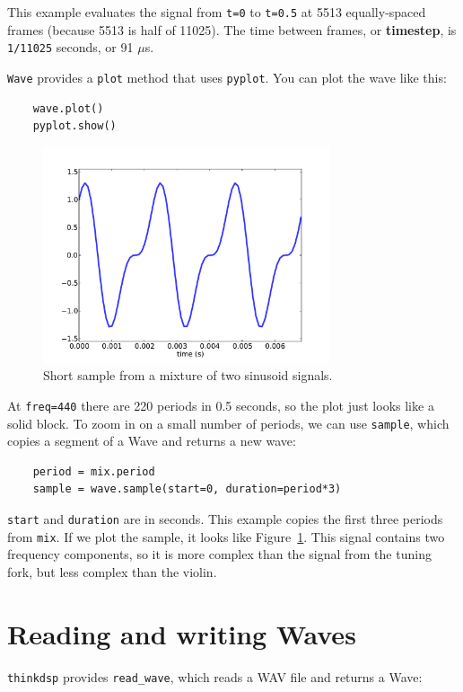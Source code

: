 \documentclass[12pt]{book}
\begin{document}
This example evaluates the signal from {\tt t=0} to {\tt t=0.5} at
5513 equally-spaced frames (because 5513 is half of 11025).
The time between frames, or {\bf timestep}, is {\tt 1/11025} seconds, or
91 $\mu$s.

{\tt Wave} provides a {\tt plot} method that uses {\tt pyplot}.
You can plot the wave like this:

\begin{verbatim}
    wave.plot()
    pyplot.show()
\end{verbatim}

\begin{figure}
\centerline{\includegraphics[height=2.5in]{figs/example1.pdf}}
\caption{Short sample from a mixture of two sinusoid signals.}
\label{fig.example1}
\end{figure}

At {\tt freq=440} there are 220 periods in 0.5 seconds,
so the plot just looks like a solid block.  To zoom in on a small
number of periods, we can use {\tt sample}, which copies a segment
of a Wave and returns a new wave:

\begin{verbatim}
    period = mix.period
    sample = wave.sample(start=0, duration=period*3)
\end{verbatim}

{\tt start} and {\tt duration} are in seconds.  This example copies
the first three periods from {\tt mix}.  If we plot the sample, it
looks like Figure~\ref{fig.example1}.  This signal contains two
frequency components, so it is more complex than the signal from the
tuning fork, but less complex than the violin.


\section{Reading and writing Waves}

{\tt thinkdsp} provides \verb"read_wave", which reads a WAV
file and returns a Wave:
\end{document}
